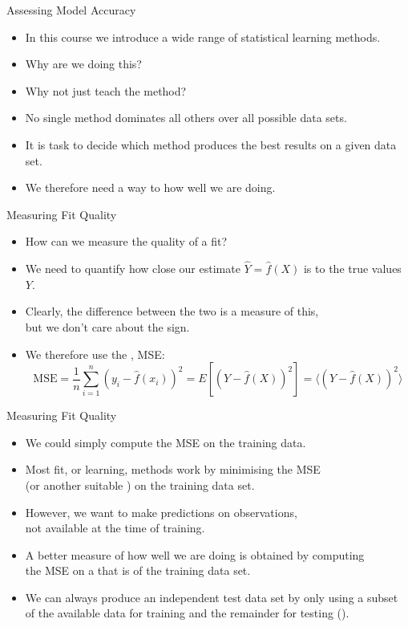 \documentclass[mathserif, aspectratio=169]{beamer}
\begin{document}
\begin{frame}{Assessing Model Accuracy}
	\begin{itemize}
		\item In this course we introduce a wide range of statistical learning methods.
		\item Why are we doing this?
		\item Why not just teach the  method?
		\item No single method dominates all others over all possible data sets.
		\item It is  task to decide which method produces the best results on
			a given data set.
		\item We therefore need a way to  how well we are doing.
	\end{itemize}
\end{frame}

\begin{frame}{Measuring Fit Quality}
	\begin{itemize}
		\item How can we measure the quality of a fit?
		\item We need to quantify how close our estimate $\hat{Y} = \hat{f}(X)$ is to the
			true values $Y$.
		\item Clearly, the difference between the two is a measure of this,\\
			but we don't care about the sign.
		\item We therefore use the , MSE:
			\[ 
				\text{MSE} = \frac{1}{n}\sum_{i=1}^n (y_i - \hat{f}(x_i))^2
				= E[(Y - \hat{f}(X))^2]
				= \langle (Y - \hat{f}(X))^2 \rangle 
			\]
	\end{itemize}
\end{frame}

\begin{frame}{Measuring Fit Quality}
	\begin{itemize}
		\item We could simply compute the MSE on the training data.
		\item Most fit, or learning, methods work by minimising the MSE\\
			(or another suitable ) on the training data set.
		\item However, we want to make predictions on  observations,\\
			not available at the time of training.
		\item A better measure of how well we are doing is obtained by computing\\
			the MSE on a  that is  of the training data set.
		\item We can always produce an independent test data set by only using a subset of 
			the available data for training and the remainder for testing ().
	\end{itemize}
\end{frame}
\end{document}

